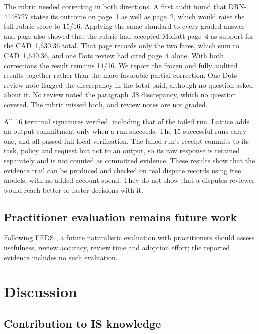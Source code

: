 \documentclass[11pt]{article}
\begin{document}
The rubric needed correcting in both directions. A first audit found that DRN-4148727 states its outcome on page~1 as well as page~2, which would raise the full-rubric score to 15/16. Applying the same standard to every graded answer and page also showed that the rubric had accepted Moffatt page~4 as support for the CAD~1,630.36 total. That page records only the two fares, which sum to CAD~1,640.36, and one Dots review had cited page~4 alone. With both corrections the result remains 14/16. We report the frozen and fully audited results together rather than the more favorable partial correction. One Dots review note flagged the discrepancy in the total paid, although no question asked about it. No review noted the paragraph~38 discrepancy, which no question covered. The rubric missed both, and review notes are not graded.

All 16 terminal signatures verified, including that of the failed run. Lattice adds an output commitment only when a run succeeds. The 15 successful runs carry one, and all passed full local verification. The failed run's receipt commits to its task, policy and request but not to an output, so its raw response is retained separately and is not counted as committed evidence. These results show that the evidence trail can be produced and checked on real dispute records using free models, with no added account spend. They do not show that a disputes reviewer would reach better or faster decisions with it.


\FloatBarrier

\subsection{Practitioner evaluation remains future work}\label{sec:eval-study}

Following FEDS \citep{venable2016}, a future naturalistic evaluation with practitioners should assess usefulness, review accuracy, review time and adoption effort; the reported evidence includes no such evaluation.

\section{Discussion}\label{sec:discussion}

\subsection{Contribution to IS knowledge}
\end{document}
